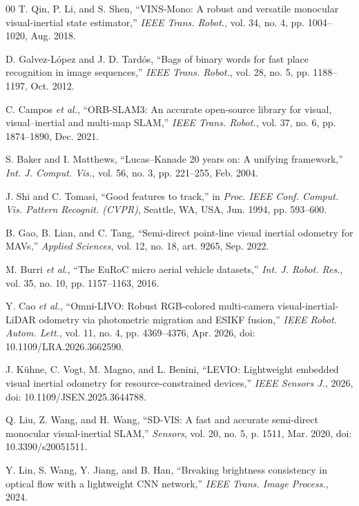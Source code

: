 \documentclass[journal,twoside,web]{ieeecolor}
\begin{document}
\begin{thebibliography}{00}
 T. Qin, P. Li, and S. Shen, ``VINS-Mono: A robust and versatile monocular visual-inertial state estimator,'' \emph{IEEE Trans. Robot.}, vol. 34, no. 4, pp. 1004--1020, Aug. 2018.

 D. Galvez-L\'opez and J. D. Tard\'os, ``Bags of binary words for fast place recognition in image sequences,'' \emph{IEEE Trans. Robot.}, vol. 28, no. 5, pp. 1188--1197, Oct. 2012.

 C. Campos \emph{et al.}, ``ORB-SLAM3: An accurate open-source library for visual, visual--inertial and multi-map SLAM,'' \emph{IEEE Trans. Robot.}, vol. 37, no. 6, pp. 1874--1890, Dec. 2021.

 S. Baker and I. Matthews, ``Lucas--Kanade 20 years on: A unifying framework,'' \emph{Int. J. Comput. Vis.}, vol. 56, no. 3, pp. 221--255, Feb. 2004.

 J. Shi and C. Tomasi, ``Good features to track,'' in \emph{Proc. IEEE Conf. Comput. Vis. Pattern Recognit. (CVPR)}, Seattle, WA, USA, Jun. 1994, pp. 593--600.

 B. Gao, B. Lian, and C. Tang, ``Semi-direct point-line visual inertial odometry for MAVs,'' \emph{Applied Sciences}, vol. 12, no. 18, art. 9265, Sep. 2022.

 M. Burri \emph{et al.}, ``The EuRoC micro aerial vehicle datasets,'' \emph{Int. J. Robot. Res.}, vol. 35, no. 10, pp. 1157--1163, 2016.

 Y. Cao \emph{et al.}, ``Omni-LIVO: Robust RGB-colored multi-camera visual-inertial-LiDAR odometry via photometric migration and ESIKF fusion,'' \emph{IEEE Robot. Autom. Lett.}, vol. 11, no. 4, pp. 4369--4376, Apr. 2026, doi: 10.1109/LRA.2026.3662590.

 J. K\"uhne, C. Vogt, M. Magno, and L. Benini, ``LEVIO: Lightweight embedded visual inertial odometry for resource-constrained devices,'' \emph{IEEE Sensors J.}, 2026, doi: 10.1109/JSEN.2025.3644788.

 Q. Liu, Z. Wang, and H. Wang, ``SD-VIS: A fast and accurate semi-direct monocular visual-inertial SLAM,'' \emph{Sensors}, vol. 20, no. 5, p. 1511, Mar. 2020, doi: 10.3390/s20051511.

 Y. Lin, S. Wang, Y. Jiang, and B. Han, ``Breaking brightness consistency in optical flow with a lightweight CNN network,'' \emph{IEEE Trans. Image Process.}, 2024.


\end{thebibliography}
\end{document}
